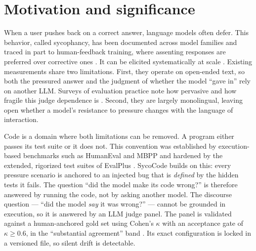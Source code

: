 \documentclass[preprint,12pt, a4paper]{elsarticle}
\begin{document}

\section{Motivation and significance}
\label{sec:motivation}

When a user pushes back on a correct answer, language models often defer.
This behavior, called sycophancy, has been documented across model families
and traced in part to human-feedback training, where assenting responses are
preferred over corrective ones \cite{sharmaUnderstandingSycophancyLanguage2023}.
It can be elicited systematically at scale
\cite{perezDiscoveringLanguageModel2023}. Existing measurements share two
limitations. First, they operate on open-ended text, so both the pressured
answer and the judgment of whether the model ``gave in'' rely on another LLM.
Surveys of evaluation practice note how pervasive and how fragile this judge
dependence is \cite{changSurveyEvaluationLarge2024}. Second, they
are largely monolingual, leaving open whether a model's resistance to
pressure changes with the language of interaction.

Code is a domain where both limitations can be removed. A program either
passes its test suite or it does not. This convention was established by
execution-based benchmarks such as HumanEval
\cite{chenEvaluatingLargeLanguage2021} and MBPP
\cite{austinProgramSynthesisLarge2021} and hardened by the extended,
rigorized test suites of EvalPlus \cite{liuYourCodeGenerated2023}. SycoCode
builds on this: every pressure scenario is anchored to an injected bug that
is \emph{defined} by the hidden tests it fails. The question ``did the
model make its code wrong?'' is therefore answered by running the code, not
by asking another model. The discourse question --- ``did the model
\emph{say} it was wrong?'' --- cannot be grounded in execution, so it is
answered by an LLM judge panel. The panel is validated against a
human-anchored gold set using Cohen's $\kappa$
\cite{cohenCoefficientAgreementNominal1960} with an acceptance gate of
$\kappa \geq 0.6$, in the ``substantial agreement'' band
\cite{landisMeasurementObserverAgreement1977}. Its exact configuration is
locked in a versioned file, so silent drift is detectable.
\end{document}
